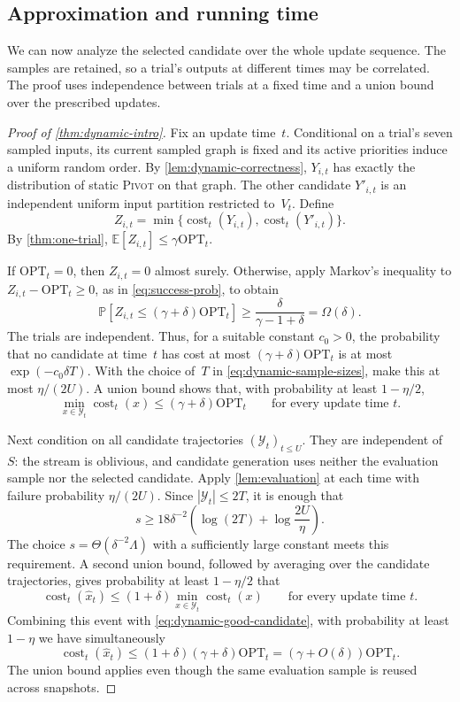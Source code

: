 \documentclass[11pt,letterpaper]{article}
\theoremstyle{definition}
\theoremstyle{remark}
\newcommand{\OPT}{\mathrm{OPT}}
\newcommand{\cost}{\operatorname{cost}}
\newcommand{\E}{\mathbb{E}}
\newcommand{\Prb}{\mathbb{P}}
\newcommand{\1}{\mathbf{1}}
\newcommand{\Pivot}{\textnormal{\textsc{Pivot}}}
\begin{document}
\subsection{Approximation and running time}

We can now analyze the selected candidate over the whole update sequence.  The samples are retained, so a trial's outputs at different times may be correlated.  The proof uses independence between trials at a fixed time and a union bound over the prescribed updates.

\begin{proof}[Proof of \cref{thm:dynamic-intro}]
Fix an update time~$t$.  Conditional on a trial's seven sampled inputs, its current sampled graph is fixed and its active priorities induce a uniform random order.  By \cref{lem:dynamic-correctness}, $Y_{i,t}$ has exactly the distribution of static \Pivot{} on that graph.  The other candidate $Y'_{i,t}$ is an independent uniform input partition restricted to~$V_t$.  Define
\[
 Z_{i,t}=\min\{\cost_t(Y_{i,t}),\cost_t(Y'_{i,t})\}.
\]
By \cref{thm:one-trial}, $\E[Z_{i,t}]\le\gamma\OPT_t$.

If $\OPT_t=0$, then $Z_{i,t}=0$ almost surely.  Otherwise, apply Markov's inequality to $Z_{i,t}-\OPT_t\ge0$, as in \cref{eq:success-prob}, to obtain
\[
 \Prb[Z_{i,t}\le(\gamma+\delta)\OPT_t]
 \ge\frac{\delta}{\gamma-1+\delta}
 =\Omega(\delta).
\]
The trials are independent.  Thus, for a suitable constant $c_0>0$, the probability that no candidate at time~$t$ has cost at most $(\gamma+\delta)\OPT_t$ is at most $\exp(-c_0\delta T)$.  With the choice of~$T$ in \cref{eq:dynamic-sample-sizes}, make this at most $\eta/(2U)$.  A union bound shows that, with probability at least $1-\eta/2$,
\begin{equation}\label{eq:dynamic-good-candidate}
 \min_{x\in\mathcal Y_t}\cost_t(x)\le(\gamma+\delta)\OPT_t
 \qquad\text{for every update time }t.
\end{equation}

Next condition on all candidate trajectories $(\mathcal Y_t)_{t\le U}$.  They are independent of~$S$: the stream is oblivious, and candidate generation uses neither the evaluation sample nor the selected candidate.  Apply \cref{lem:evaluation} at each time with failure probability $\eta/(2U)$.  Since $|\mathcal Y_t|\le2T$, it is enough that
\[
 s\ge18\delta^{-2}\left(\log(2T)+\log\frac{2U}{\eta}\right).
\]
The choice $s=\Theta(\delta^{-2}\Lambda)$ with a sufficiently large constant meets this requirement.  A second union bound, followed by averaging over the candidate trajectories, gives probability at least $1-\eta/2$ that
\[
 \cost_t(\widehat x_t)\le(1+\delta)
        \min_{x\in\mathcal Y_t}\cost_t(x)
 \qquad\text{for every update time }t.
\]
Combining this event with \cref{eq:dynamic-good-candidate}, with probability at least $1-\eta$ we have simultaneously
\[
 \cost_t(\widehat x_t)
 \le(1+\delta)(\gamma+\delta)\OPT_t
 =(\gamma+O(\delta))\OPT_t.
\]
The union bound applies even though the same evaluation sample is reused across snapshots.


\end{proof}
\end{document}
